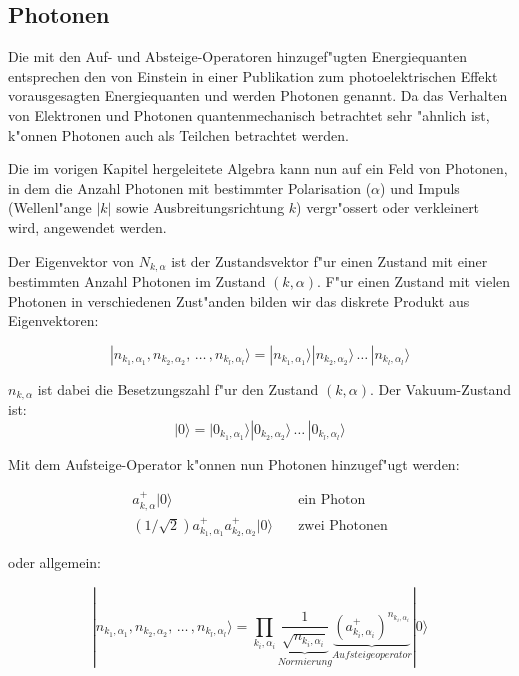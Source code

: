 \subsection{Photonen}

Die mit den Auf- und Absteige-Operatoren hinzugef"ugten Energiequanten entsprechen den von Einstein in einer Publikation zum photoelektrischen Effekt vorausgesagten Energiequanten und werden Photonen genannt. Da das Verhalten von Elektronen und Photonen quantenmechanisch betrachtet sehr "ahnlich ist, k"onnen Photonen auch als Teilchen betrachtet werden.

Die im vorigen Kapitel hergeleitete Algebra kann nun auf ein Feld von Photonen, in dem die Anzahl Photonen mit bestimmter Polarisation ($\alpha$) und Impuls (Wellenl"ange $|k|$ sowie Ausbreitungsrichtung $k$) vergr"ossert oder verkleinert wird, angewendet werden.

Der Eigenvektor von $N_{k,\alpha}$ ist der Zustandsvektor f"ur einen Zustand mit einer bestimmten Anzahl Photonen im Zustand $(k,\alpha)$. F"ur einen Zustand mit vielen Photonen in verschiedenen Zust"anden bilden wir das diskrete Produkt aus Eigenvektoren:

\begin{equation*}
|n_{k_1,\alpha_1}, n_{k_2,\alpha_2}, \, \hdots \, , n_{k_l,\alpha_l}\rangle = |n_{k_1,\alpha_1}\rangle |n_{k_2,\alpha_2}\rangle \, \hdots \, |n_{k_l,\alpha_l}\rangle
\end{equation*}

$n_{k,\alpha}$ ist dabei die Besetzungszahl f"ur den Zustand $(k,\alpha)$. Der Vakuum-Zustand ist:
\begin{equation*}
|0\rangle = |0_{k_1,\alpha_1}\rangle |0_{k_2,\alpha_2}\rangle \, \hdots \, |0_{k_l,\alpha_l}\rangle
\end{equation*}

Mit dem Aufsteige-Operator k"onnen nun Photonen hinzugef"ugt werden:

\begin{align*}
a^+_{k,\alpha}|0\rangle & \quad \text{ein Photon}\\
\left(1/\sqrt{2}\right)a^+_{k_1,\alpha_1}a^+_{k_2,\alpha_2}|0\rangle & \quad \text{zwei Photonen}
\end{align*}

oder allgemein:

\begin{equation*}
|n_{k_1,\alpha_1}, n_{k_2,\alpha_2}, \, \hdots \, , n_{k_l,\alpha_l}\rangle =
 \prod_{k_i,\alpha_i}\underbrace{\frac{1}{\sqrt{n_{k_i,\alpha_i}}}}_{Normierung} \underbrace{\left(a^+_{k_i,\alpha_i}\right)^{n_{k_i,\alpha_i}}}_{Aufsteigeoperator} |0\rangle
\end{equation*}

